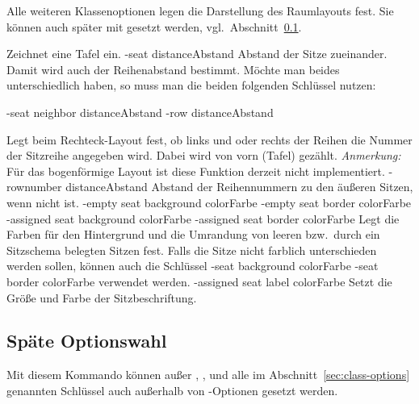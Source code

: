 \documentclass[
babel-options={ngerman},
load-preamble-,
scrartcl={headings=small}
]{cnltx-doc}
\begin{document}
Alle weiteren Klassenoptionen legen die Darstellung des Raumlayouts fest.
Sie können auch später mit  gesetzt werden, vgl.\ Abschnitt~\ref{sec:late-options}.
\begin{options}
  Zeichnet eine Tafel ein.
  \keyval-{seat distance}{Abstand}\Default{2pt}
  Abstand der Sitze zueinander. Damit wird auch der Reihenabstand bestimmt.
  Möchte man beides unterschiedlich haben, so muss man die beiden folgenden
  Schlüssel nutzen:
  
  \keyval-{seat neighbor distance}{Abstand}\Default*{2pt}\vspace{-.3\baselineskip}
  \keyval-{row distance}{Abstand}\Default{2pt}

  Legt beim Rechteck-Layout fest, ob links und oder rechts der Reihen die Nummer
  der Sitzreihe angegeben wird. Dabei wird von vorn (Tafel) gezählt.\newline
  \emph{Anmerkung:} Für das bogenförmige Layout ist diese Funktion derzeit
  nicht implementiert.
  \keyval-{rownumber distance}{Abstand}\Default{2pt}
  Abstand der Reihennummern zu den äußeren Sitzen, wenn 
  nicht  ist.
  \keyval-{empty seat background color}{Farbe}\vspace{-.3\baselineskip}
  \keyval-{empty seat border color}{Farbe}\vspace{-.3\baselineskip}
  \keyval-{assigned seat background color}{Farbe}\vspace{-.3\baselineskip}
  \keyval-{assigned seat border color}{Farbe}
  Legt die Farben für den Hintergrund und die Umrandung von leeren bzw.\ durch
  ein Sitzschema belegten Sitzen fest.
  Falls die Sitze nicht farblich unterschieden werden sollen, können auch die
  Schlüssel
  \keyval-{seat background color}{Farbe}\Default*\vspace{-.3\baselineskip}
  \keyval-{seat border color}{Farbe}\Default
  verwendet werden.
  \vspace{-.3\baselineskip}
  \keyval-{assigned seat label color}{Farbe}
  Setzt die Größe und Farbe der Sitzbeschriftung.
\end{options}
\subsection{Späte Optionswahl}
\label{sec:late-options}
\begin{commands}
   Mit diesem Kommando können außer
  , ,  und  alle
  im Abschnitt~\ref{sec:class-options} genannten Schlüssel auch
  außerhalb von -Optionen gesetzt werden.
\end{commands}
\end{document}
